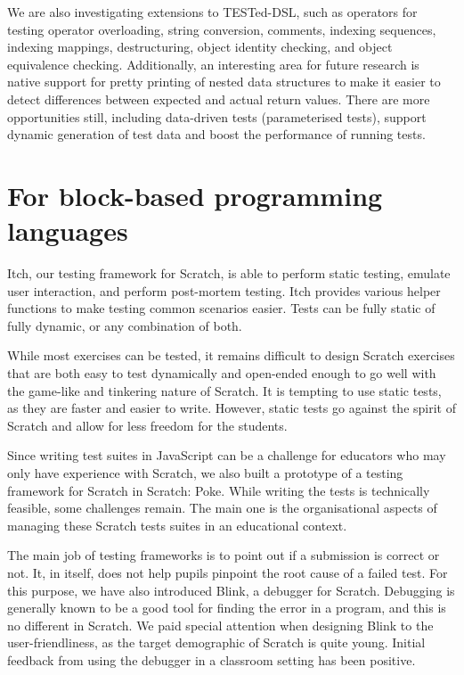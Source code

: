 \documentclass[main]{subfiles}
\begin{document}
We are also investigating extensions to TESTed-DSL, such as operators for testing operator overloading, string conversion, comments, indexing sequences, indexing mappings, destructuring, object identity checking, and object equivalence checking.
Additionally, an interesting area for future research is native support for pretty printing of nested data structures to make it easier to detect differences between expected and actual return values.
There are more opportunities still, including data-driven tests (parameterised tests), support dynamic generation of test data and boost the performance of running tests.

\section{For block-based programming languages}\label{sec:for-block-based-programming-languages}

Itch, our testing framework for Scratch, is able to perform static testing, emulate user interaction, and perform post-mortem testing.
Itch provides various helper functions to make testing common scenarios easier.
Tests can be fully static of fully dynamic, or any combination of both.

While most exercises can be tested, it remains difficult to design Scratch exercises that are both easy to test dynamically and open-ended enough to go well with the game-like and tinkering nature of Scratch.
It is tempting to use static tests, as they are faster and easier to write.
However, static tests go against the spirit of Scratch and allow for less freedom for the students.

Since writing test suites in JavaScript can be a challenge for educators who may only have experience with Scratch, we also built a prototype of a testing framework for Scratch in Scratch: Poke.
While writing the tests is technically feasible, some challenges remain.
The main one is the organisational aspects of managing these Scratch tests suites in an educational context.

The main job of testing frameworks is to point out if a submission is correct or not.
It, in itself, does not help pupils pinpoint the root cause of a failed test.
For this purpose, we have also introduced Blink, a debugger for Scratch.
Debugging is generally known to be a good tool for finding the error in a program, and this is no different in Scratch.
We paid special attention when designing Blink to the user-friendliness, as the target demographic of Scratch is quite young.
Initial feedback from using the debugger in a classroom setting has been positive.
\end{document}
